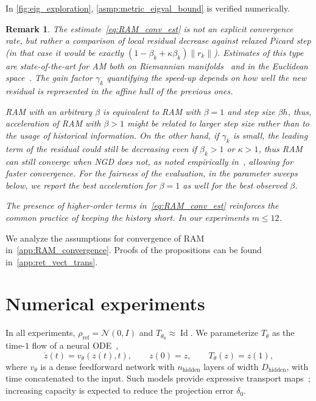 \documentclass{article} %
\numberwithin{equation}{subsection}
\numberwithin{theorem}{section}
\newcommand{\Id}{\operatorname{Id}}
\newcommand{\rhoref}{{\rho_{\text{ref}}}}
\newtheorem{remark}{Remark}[section]
\begin{document}
In \autoref{fig:eig_exploration}, \autoref{asmp:metric_eigval_bound} is verified numerically. 
    \begin{remark}
        The estimate~\eqref{eq:RAM_conv_est} is not an explicit convergence rate, but rather a comparison of local residual decrease against relaxed Picard step (in that case it would be exactly $\left(1-\beta_k+\kappa\beta_k\right)\|r_k\|$). 
        Estimates of this type are state-of-the-art for AM both on Riemannian manifolds~\cite{li2023riemannian} and in the Euclidean space~\cite{toth2015convergence,evans2020proof,rebholz2023effect}.
        The gain factor $\gamma_k$ quantifying the speed-up depends on how well the new residual is represented in the affine hull of the previous ones.
    
        
        RAM with an arbitrary $\beta$ is equivalent to RAM with $\beta = 1$ and step size $\beta h$, thus, acceleration of RAM with $\beta > 1$ might be related to larger step size rather than to the usage of historical information. 
        On the other hand, if $\gamma_k$ is small, the leading term of the residual could still be decreasing even if $\beta_k > 1$ or $\kappa > 1$, thus  RAM can still converge when NGD does not, as noted empirically in~\cite{lott2012accelerated,willert2014leveraging}, allowing for faster convergence.
        For the fairness of the evaluation, in the parameter sweeps below, we report the best acceleration for $\beta = 1$ as well for the best observed $\beta$. 
        
        The presence of higher-order terms in~\eqref{eq:RAM_conv_est} reinforces the common practice of keeping the history short.
        In our experiments  $m \leq 12$.
    \end{remark}
    We analyze the assumptions for convergence of RAM in~\autoref{app:RAM_convergence}.
    Proofs of the propositions can be found in~\autoref{app:ret_vect_trans}.
    
    


\section{Numerical experiments}\label{sec:experiments}
In all experiments, $\rhoref=\mathcal N(0,I)$ and $T_{\theta_0}\approx\Id$.
We parameterize $T_\theta$ as the time-$1$ flow of a neural ODE~\cite{chen2018neural},
\[
    \dot z(t)=v_\theta(z(t),t),\qquad z(0)=z,\qquad T_\theta(z)=z(1),
\]
where $v_\theta$ is a dense feedforward network with $n_{\mathrm{hidden}}$ layers of width $D_{\mathrm{hidden}}$, with time concatenated to the input. Such models provide expressive transport maps~\cite{holderrieth_introduction_2025};
increasing capacity is expected to reduce the projection error $\delta_0$. 
\end{document}
